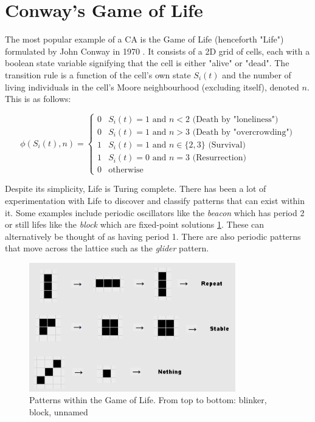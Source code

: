 \section{Conway's Game of Life}
The most popular example of a CA is the Game of Life (henceforth "Life") formulated by John Conway in 1970 \cite{gardner1970fantastic}. It consists of a 2D grid of cells, each with a boolean state variable signifying that the cell is either "alive" or "dead". The transition rule is a function of the cell's own state $S_i(t)$ and the number of living individuals in the cell's Moore neighbourhood (excluding itself), denoted $n$. This is as follows:

\begin{equation}
  \phi(S_i(t), n) = 
\begin{cases}
  0 & S_i(t) = 1 \text{ and } n < 2 \text{  (Death by "loneliness")}\\
  0 & S_i(t) = 1 \text{ and } n > 3 \text{  (Death by "overcrowding")}\\
  1 & S_i(t) = 1 \text{ and } n \in \{2,3\} \text{  (Survival)}\\
  1 & S_i(t) = 0 \text{ and } n = 3 \text{  (Resurrection)}\\
  0 & \text{otherwise}
\end{cases}
\end{equation}

Despite its simplicity, Life is Turing complete. There has been a lot of experimentation with Life to discover and classify patterns that can exist within it. Some examples include periodic oscillators like the \textit{beacon} which has period 2 or still lifes like the \textit{block} which are fixed-point solutions \ref{fig:life-patterns}. These can alternatively be thought of as having period 1. There are also periodic patterns that move across the lattice such as the \textit{glider} pattern.

\begin{figure}[!h]
\centering
\includegraphics[width=0.8\textwidth]{images/life-patterns.png}
\caption{Patterns within the Game of Life. From top to bottom: blinker, block, unnamed \cite{lipa}}
\label{fig:life-patterns}
\end{figure}


